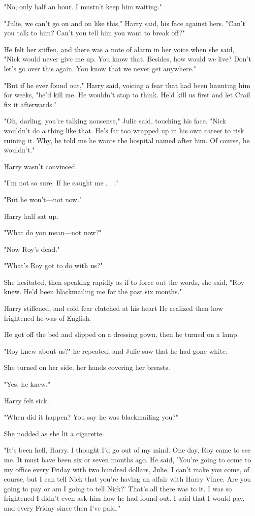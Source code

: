 \documentclass{novel}
\begin{document}
"No, only half an hour. I mustn't keep him waiting."

"Julie, we can't go on and on like this," Harry said, his face against hers. "Can't you talk to him? Can't you tell him you want to break off?"

He felt her stiffen, and there was a note of alarm in her voice when she said, "Nick would never give me up. You know that. Besides, how would we live? Don't let's go over this again. You know that we never get anywhere."

"But if he ever found out," Harry said, voicing a fear that had been haunting him for weeks, "he'd kill me. He wouldn't stop to think. He'd kill us first and let Crail fix it afterwards."

"Oh, darling, you're talking nonsense," Julie said, touching his face. "Nick wouldn't do a thing like that. He's far too wrapped up in his own career to risk ruining it. Why, he told me he wants the hospital named after him. Of course, he wouldn't."

Harry wasn't convinced.

"I'm not so sure. If he caught me . . ."

"But he won't—not now."

Harry half sat up.

"What do you mean—not now?"

"Now Roy's dead."

"What's Roy got to do with us?"

She hesitated, then speaking rapidly as if to force out the words, she said, "Roy knew. He'd been blackmailing me for the past six months."

Harry stiffened, and cold fear clutched at his heart He realized then how frightened he was of English.

He got off the bed and slipped on a dressing gown, then he turned on a lamp.

"Roy knew about us?" he repeated, and Julie saw that he had gone white.

She turned on her side, her hands covering her breasts.

"Yes, he knew."

Harry felt sick.

"When did it happen? You say he was blackmailing you?"

She nodded as she lit a cigarette.

"It's been hell, Harry. I thought I'd go out of my mind. One day, Roy came to see me. It must have been six or seven months ago. He said, 'You're going to come to my office every Friday with two hundred dollars, Julie. I can't make you come, of course, but I can tell Nick that you're having an affair with Harry Vince. Are you going to pay or am I going to tell Nick?' That's all there was to it. I was so frightened I didn't even ask him how he had found out. I said that I would pay, and every Friday since then I've paid."
\end{document}
